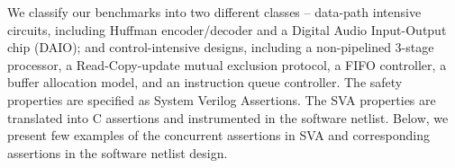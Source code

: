 We classify our benchmarks into two different classes -- data-path intensive
circuits, including Huffman encoder/decoder and a Digital Audio
Input-Output chip (DAIO); and control-intensive designs,
including a non-pipelined 3-stage processor, a Read-Copy-update
mutual exclusion protocol, a FIFO controller, a buffer allocation model,
and an instruction queue controller.   
%
%
The safety properties are specified as System Verilog Assertions.
The SVA properties are translated into C assertions and instrumented 
in the software netlist. 
%
Below, we present few examples of the concurrent assertions in SVA 
and corresponding assertions in the software netlist design.  



